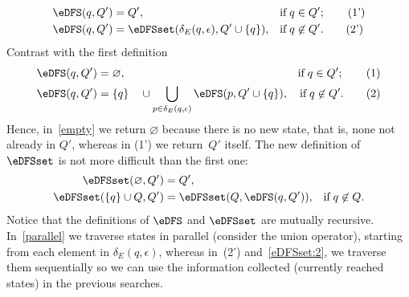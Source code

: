 \begin{align*}
  \eDFS (q, Q')
&= Q',
&& \text{if} \; q \in Q'; \tag{1'}\\
  \eDFS (q, Q')
&= \eDFSset (\delta_E (q, \epsilon), Q' \cup \{q\}),
&& \text{if} \; q \not\in Q'. \tag{2'}
\end{align*}
Contrast with the first definition
\begin{align*}
   \eDFS (q, Q')
&= \varnothing,
& \text{if} \; q \in Q'; \tag{1} \label{empty}\\
  \eDFS (q, Q')
&= \{q\} \quad \cup \bigcup_{p \in \delta_E(q,\epsilon)}{\eDFS (p, Q'
    \cup \{q\})},
& \text{if} \; q \not\in Q'. \tag{2} \label{parallel}
\end{align*}
Hence, in~\eqref{empty} we return \(\varnothing\) because there is no
new state, that is, none not already in \(Q'\), whereas in (1') we
return~\(Q'\) itself. The new definition of \(\eDFSset\) is not more
difficult than the first one:
\begin{align}
   \eDFSset (\varnothing, Q')
&= Q',\label{eDFSset:1}\\
   \eDFSset (\{q\} \cup Q, Q')
&= \eDFSset (Q, \eDFS (q, Q')),
& \text{if} \; q \not\in Q. \label{eDFSset:2}
\end{align}
Notice that the definitions of \(\eDFS\) and \(\eDFSset\) are mutually
recursive. In~\eqref{parallel} we traverse states in parallel
(consider the union operator), starting from each element in
\(\delta_E (q, \epsilon)\), whereas in~(2') and~\eqref{eDFSset:2}, we
traverse them sequentially so we can use the information collected
(currently reached states) in the previous searches.


